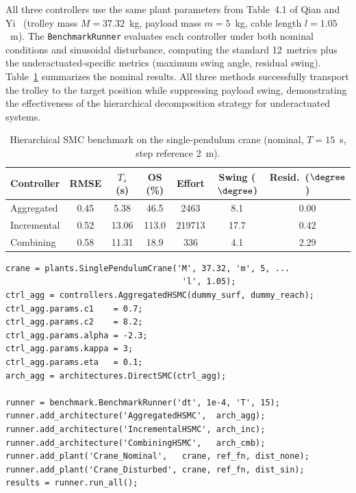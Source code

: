 \documentclass[preprint,12pt]{elsarticle}
\begin{document}
All three controllers use the same plant parameters from Table~4.1 of Qian and Yi~\cite{qian2015hierarchical} (trolley mass $M = 37.32$~kg, payload mass $m = 5$~kg, cable length $l = 1.05$~m). The \texttt{BenchmarkRunner} evaluates each controller under both nominal conditions and sinusoidal disturbance, computing the standard 12~metrics plus the underactuated-specific metrics (maximum swing angle, residual swing). Table~\ref{tab:crane} summarizes the nominal results. All three methods successfully transport the trolley to the target position while suppressing payload swing, demonstrating the effectiveness of the hierarchical decomposition strategy for underactuated systems.

\begin{table}[t]
\centering
\small
\caption{Hierarchical SMC benchmark on the single-pendulum crane (nominal, $T=15$~s, step reference 2~m).}
\label{tab:crane}
\begin{tabular}{lcccccc}
\toprule
\textbf{Controller} & \textbf{RMSE} & \textbf{$T_s$ (s)} & \textbf{OS (\%)} & \textbf{Effort} & \textbf{Swing ($\degree$)} & \textbf{Resid.\ ($\degree$)} \\
\midrule
Aggregated  & 0.45 & 5.38 & 46.5 & 2463 & 8.1 & 0.00 \\
Incremental & 0.52 & 13.06 & 113.0 & 219713 & 17.7 & 0.42 \\
Combining   & 0.58 & 11.31 & 18.9 & 336 & 4.1 & 2.29 \\
\bottomrule
\end{tabular}
\end{table}

\begin{lstlisting}[style=matlab,caption={Hierarchical SMC benchmark setup (excerpt from \texttt{example\_benchmark\_crane.m}).},label=lst:crane]
crane = plants.SinglePendulumCrane('M', 37.32, 'm', 5, ...
                                    'l', 1.05);
ctrl_agg = controllers.AggregatedHSMC(dummy_surf, dummy_reach);
ctrl_agg.params.c1    = 0.7;
ctrl_agg.params.c2    = 8.2;
ctrl_agg.params.alpha = -2.3;
ctrl_agg.params.kappa = 3;
ctrl_agg.params.eta   = 0.1;
arch_agg = architectures.DirectSMC(ctrl_agg);

runner = benchmark.BenchmarkRunner('dt', 1e-4, 'T', 15);
runner.add_architecture('AggregatedHSMC',  arch_agg);
runner.add_architecture('IncrementalHSMC', arch_inc);
runner.add_architecture('CombiningHSMC',   arch_cmb);
runner.add_plant('Crane_Nominal',   crane, ref_fn, dist_none);
runner.add_plant('Crane_Disturbed', crane, ref_fn, dist_sin);
results = runner.run_all();
\end{lstlisting}
\end{document}
